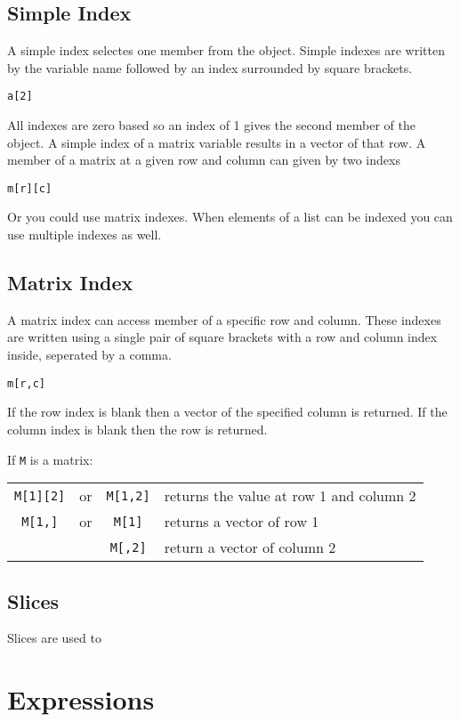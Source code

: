 \documentclass{article}
\begin{document}
\subsection{Simple Index}
A simple index selectes one member from the object.
Simple indexes are written by the variable name followed by an index surrounded
by square brackets.
\begin{verbatim}
a[2]
\end{verbatim}
All indexes are zero based so an index of 1 gives the second member of the object.
A simple index of a matrix variable results in a vector of that row.
A member of a matrix at a given row and column can given by two indexs
\begin{verbatim}
m[r][c]
\end{verbatim}
Or you could use matrix indexes.
When elements of a list can be indexed you can use multiple indexes as well.

\subsection{Matrix Index}
A matrix index can access member of a specific row and column.
These indexes are written using a single pair of square brackets with
a row and column index inside, seperated by a comma.
\begin{verbatim}
m[r,c]
\end{verbatim}
If the row index is blank then a vector of the specified column is returned.
If the column index is blank then the row is returned.

If \verb|M| is a matrix:
\begin{center}
  \begin{tabular}{cccl}
    \verb|M[1][2]| & or & \verb|M[1,2]| & returns the value at row 1 and column 2 \\
    \verb|M[1,]| & or & \verb|M[1]| & returns a vector of row 1 \\
    && \verb|M[,2]| & return a vector of column 2 \\
  \end{tabular}
\end{center}

\subsection{Slices}
Slices are used to 


\section{Expressions}
\end{document}
